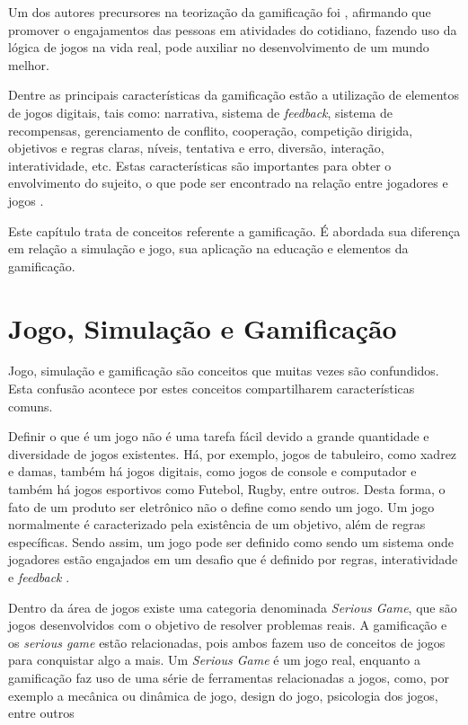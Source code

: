 \documentclass[
	12pt,				%
	oneside,			%
	a4paper,			%
	english,			%
	french,				%
	spanish,			%
	brazil,				%
	]{abntex2}
\begin{document}
Um dos autores precursores na teorização da gamificação foi \citet{mcgonigal2011reality}, afirmando que promover o engajamentos das pessoas em atividades do cotidiano, fazendo uso da lógica de jogos na vida real, pode auxiliar no desenvolvimento de um mundo melhor.

Dentre as principais características da gamificação estão a utilização de elementos de jogos digitais, tais como: narrativa, sistema de \textit{feedback}, sistema de recompensas, gerenciamento de conflito, cooperação, competição dirigida, objetivos e regras claras, níveis, tentativa e erro, diversão, interação, interatividade, etc. Estas características são importantes para obter o envolvimento do sujeito, o que pode ser encontrado na relação entre jogadores e jogos \cite{deterding2011game}.

Este capítulo trata de conceitos referente a gamificação. É abordada sua diferença em relação a simulação e jogo, sua aplicação na educação e elementos da gamificação.

\section{Jogo, Simulação e Gamificação}

Jogo, simulação e gamificação são conceitos que muitas vezes são confundidos. Esta confusão acontece por estes conceitos compartilharem características comuns.

Definir o que é um jogo não é uma tarefa fácil devido a grande quantidade e diversidade de jogos existentes. Há, por exemplo, jogos de tabuleiro, como xadrez e damas, também há jogos digitais, como jogos de console e computador e também há jogos esportivos como Futebol, Rugby, entre outros. Desta forma, o fato de um produto ser eletrônico não o define como sendo um jogo. Um jogo normalmente é caracterizado pela existência de um objetivo, além de regras específicas. Sendo assim, um jogo pode ser definido como sendo um sistema onde jogadores estão engajados em um desafio que é definido por regras, interatividade e \textit{feedback} \cite{kaap:2014}. 

Dentro da área de jogos existe uma categoria denominada \textit{Serious Game}, que são jogos desenvolvidos com o objetivo de resolver problemas reais. A gamificação e os \textit{serious game} estão relacionadas, pois ambos fazem uso de conceitos de jogos para conquistar algo a mais. Um \textit{Serious Game} é um jogo real, enquanto a gamificação faz uso de uma série de ferramentas relacionadas a jogos, como, por exemplo a mecânica ou dinâmica de jogo, design do jogo, psicologia dos jogos, entre outros \cite{dorling2012software}
\end{document}
